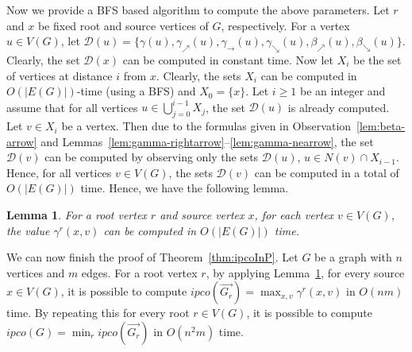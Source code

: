 \documentclass[a4paper]{article}
\newcommand{\dist}[2]{\mathsf{d}\left(#1,#2\right)}
\newcommand{\ipco}[1]{ipco\left(#1\right)}
\newtheorem{lemma}[theorem]{Lemma}
\begin{document}
\sloppy Now we provide a BFS based algorithm to compute the above parameters.
Let $r$ and $x$ be fixed root and source vertices of $G$,
respectively. For a vertex $u\in V(G)$, let
$\mathcal{D}(u) = \{\gamma(u), \gamma_{\nearrow}(u),
\gamma_{\rightarrow}(u), \gamma_{\searrow}(u), \beta_{\nearrow}(u),
\beta_{\searrow}(u)\}$.  Clearly, the set $\mathcal{D}(x)$ can be
computed in constant time. Now let $X_i$ be the set of vertices at
distance $i$ from $x$. Clearly, the sets $X_i$ can be computed in
$O(|E(G)|)$-time (using a BFS) and $X_0=\{x\}$. Let $i\geq 1$ be an
integer and assume that for all vertices
$u \in \bigcup_{j=0}^{i-1} X_j$, the set $\mathcal{D}(u)$ is already
computed. Let $v\in X_i$ be a vertex. Then due to the formulas given
in Observation~\ref{lem:beta-arrow} and
Lemmas~\ref{lem:gamma-rightarrow}--\ref{lem:gamma-nearrow}, the set
$\mathcal{D}(v)$ can be computed by observing only the sets
$\mathcal{D}(u)$, $u\in N(v) \cap X_{i-1}$. Hence, for all vertices
$v\in V(G)$, the sets $\mathcal{D}(v)$ can be computed in a total of
$O(|E(G)|)$ time. Hence, we have the following lemma.

\begin{lemma}\label{lem:main-gamma}
    For a root vertex $r$ and source vertex $x$, for each vertex $v\in V(G)$, the value $\gamma^r(x,v)$ can be computed in $O(|E(G)|)$ time. 
\end{lemma}



We can now finish the proof of Theorem~\ref{thm:ipcoInP}.  Let $G$ be
a graph with $n$ vertices and $m$ edges. For a root vertex $r$, by
applying Lemma~\ref{lem:main-gamma}, for every source $x \in V(G)$, it
is possible to compute
$\ipco{\overrightarrow{G_r}} = \max_{x,v} \gamma^r(x,v)$ in $O(nm)$
time. By repeating this for every root $r\in V(G)$, it is possible to
compute $\ipco{G} = \min_r \ipco{\overrightarrow{G_r}}$ in $O(n^2 m)$
time.
\end{document}
